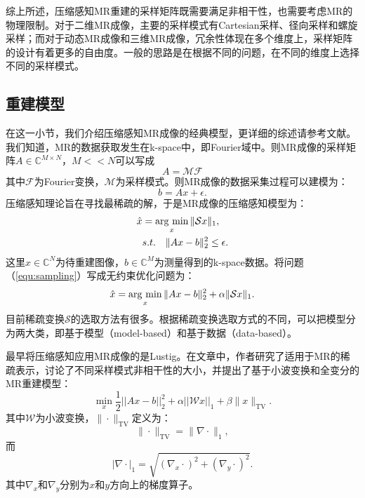 综上所述，压缩感知MR重建的采样矩阵既需要满足非相干性，也需要考虑MR的物理限制。对于二维MR成像，主要的采样模式有Cartesian采样、径向采样和螺旋采样；而对于动态MR成像和三维MR成像，冗余性体现在多个维度上，采样矩阵的设计有着更多的自由度。一般的思路是在根据不同的问题，在不同的维度上选择不同的采样模式。

\subsection{重建模型}
\label{sec:models}
在这一小节，我们介绍压缩感知MR成像的经典模型，更详细的综述请参考文献\cite{ravishankar2019image,ye2019compressed}。我们知道，MR的数据获取发生在k-space中，即Fourier域中。则MR成像的采样矩阵$A\in \mathbb{C}^{M\times N}$，$M<<N$可以写成
\begin{equation}
	A=\mathcal{MF}
\end{equation}
其中$\mathcal{F}$为Fourier变换，$\mathcal{M}$为采样模式。则MR成像的数据采集过程可以建模为：
\begin{equation}
	b=Ax+\epsilon.
\end{equation}
压缩感知理论旨在寻找最稀疏的解，于是MR成像的压缩感知模型为：
\begin{equation}
\begin{aligned}
	\hat{x}&=\argmin_x \|\mathcal{S}x\|_1,\\
	&s.t.\quad \|Ax-b\|_2^2 \leq \epsilon.
	\label{equ:sampling}
\end{aligned}
\end{equation}
这里$x\in \mathbb{C}^N$为待重建图像，$b\in\mathbb{C}^M$为测量得到的k-space数据。将问题（\ref{equ:sampling}）写成无约束优化问题为：
\begin{equation}
	\hat{x}=\argmin_x \|Ax-b\|^2_2+\alpha\|\mathcal{S}x\|_1.
\end{equation}
目前稀疏变换$\mathcal{S}$的选取方法有很多。根据稀疏变换选取方式的不同，可以把模型分为两大类，即基于模型（model-based）和基于数据（data-based）。

最早将压缩感知应用MR成像的是Lustig\cite{lustig2006}。在文章中，作者研究了适用于MR的稀疏表示，讨论了不同采样模式非相干性的大小，并提出了基于小波变换和全变分的MR重建模型：
\begin{equation}
	\min_x\frac{1}{2}||Ax-b||^2_2+\alpha ||\mathcal{W}x||_1+\beta \|x\|_\mathrm{TV}.
	\label{equ:wandtv}
\end{equation}
其中$\mathcal{W}$为小波变换，$\|\cdot\|_\mathrm{TV}$定义为：
$$\|\cdot\|_\mathrm{TV} = \|\nabla\cdot\|_1,$$
而
$$|\nabla\cdot|_1=\sqrt{(\nabla_x \cdot)^2+(\nabla_y \cdot)^2}.$$
其中$\nabla_x$和$\nabla_y$分别为$x$和$y$方向上的梯度算子。

